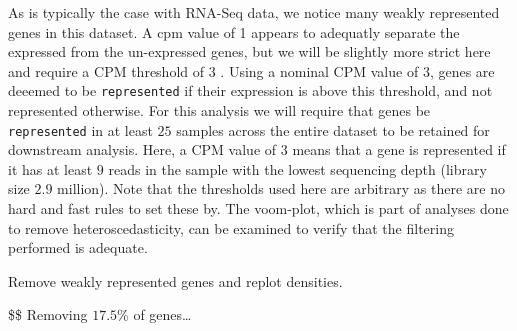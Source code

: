 \documentclass[
]{book}
\newenvironment{Shaded}{\begin{snugshade}}{\end{snugshade}}
\newcommand{\CommentTok}[1]{\textcolor[rgb]{0.56,0.35,0.01}{\textit{#1}}}
\newcommand{\ControlFlowTok}[1]{\textcolor[rgb]{0.13,0.29,0.53}{\textbf{#1}}}
\newcommand{\DataTypeTok}[1]{\textcolor[rgb]{0.13,0.29,0.53}{#1}}
\newcommand{\DecValTok}[1]{\textcolor[rgb]{0.00,0.00,0.81}{#1}}
\newcommand{\FloatTok}[1]{\textcolor[rgb]{0.00,0.00,0.81}{#1}}
\newcommand{\KeywordTok}[1]{\textcolor[rgb]{0.13,0.29,0.53}{\textbf{#1}}}
\newcommand{\NormalTok}[1]{#1}
\newcommand{\OperatorTok}[1]{\textcolor[rgb]{0.81,0.36,0.00}{\textbf{#1}}}
\newcommand{\StringTok}[1]{\textcolor[rgb]{0.31,0.60,0.02}{#1}}
\begin{document}
\[
\]

As is typically the case with RNA-Seq data, we notice many weakly represented genes
in this dataset. A cpm value of 1 appears to adequatly separate
the expressed from the un-expressed genes, but we will be slightly more strict here
and require a CPM threshold of \(3\) . Using a nominal CPM value of
\(3\), genes are deeemed to be \texttt{represented} if their expression is
above this threshold, and not represented otherwise.
For this analysis we will require that genes be \texttt{represented} in at least
\(25\) samples across the entire dataset to be retained for downstream analysis.
Here, a CPM value of \(3\) means that a gene is represented if it
has at least \(9\) reads in the sample with the
lowest sequencing depth (library size \(2.9\) million).
Note that the thresholds used here are arbitrary as there are no hard and fast
rules to set these by.
The voom-plot, which is part of analyses done to remove heteroscedasticity,
can be examined to verify that the filtering performed is adequate.

Remove weakly represented genes and replot densities.

\$\$
Removing \(17.5\)\% of genes\ldots{}

\begin{Shaded}
\end{Shaded}
\end{document}
